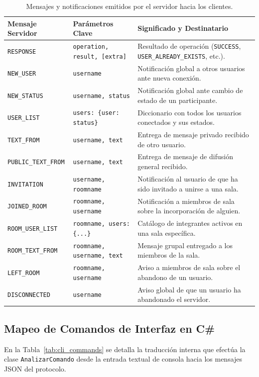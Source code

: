 \documentclass[12pt,a4paper]{article}
\begin{document}
\begin{table}[htbp]
\centering
\footnotesize
\renewcommand{\arraystretch}{0.92}
\begin{tabularx}{\textwidth}{l p{4.2cm} X}
\toprule
\textbf{Mensaje Servidor} & \textbf{Parámetros Clave} & \textbf{Significado y Destinatario} \\
\midrule
\texttt{RESPONSE} & \texttt{operation, result, [extra]} & Resultado de operación (\texttt{SUCCESS}, \texttt{USER\_ALREADY\_EXISTS}, etc.). \\
\texttt{NEW\_USER} & \texttt{username} & Notificación global a otros usuarios ante nueva conexión. \\
\texttt{NEW\_STATUS} & \texttt{username, status} & Notificación global ante cambio de estado de un participante. \\
\texttt{USER\_LIST} & \texttt{users: \{user: status\}} & Diccionario con todos los usuarios conectados y sus estados. \\
\texttt{TEXT\_FROM} & \texttt{username, text} & Entrega de mensaje privado recibido de otro usuario. \\
\texttt{PUBLIC\_TEXT\_FROM} & \texttt{username, text} & Entrega de mensaje de difusión general recibido. \\
\texttt{INVITATION} & \texttt{username, roomname} & Notificación al usuario de que ha sido invitado a unirse a una sala. \\
\texttt{JOINED\_ROOM} & \texttt{roomname, username} & Notificación a miembros de sala sobre la incorporación de alguien. \\
\texttt{ROOM\_USER\_LIST} & \texttt{roomname, users: \{...\}} & Catálogo de integrantes activos en una sala específica. \\
\texttt{ROOM\_TEXT\_FROM} & \texttt{roomname, username, text} & Mensaje grupal entregado a los miembros de la sala. \\
\texttt{LEFT\_ROOM} & \texttt{roomname, username} & Aviso a miembros de sala sobre el abandono de un usuario. \\
\texttt{DISCONNECTED} & \texttt{username} & Aviso global de que un usuario ha abandonado el servidor. \\
\bottomrule
\end{tabularx}
\caption{Mensajes y notificaciones emitidos por el servidor hacia los clientes.}
\label{tab:proto_resp}
\end{table}

\subsection{Mapeo de Comandos de Interfaz en C\#}
En la Tabla~\ref{tab:cli_commands} se detalla la traducción interna que efectúa la clase \texttt{AnalizarComando} desde la entrada textual de consola hacia los mensajes JSON del protocolo.
\end{document}

